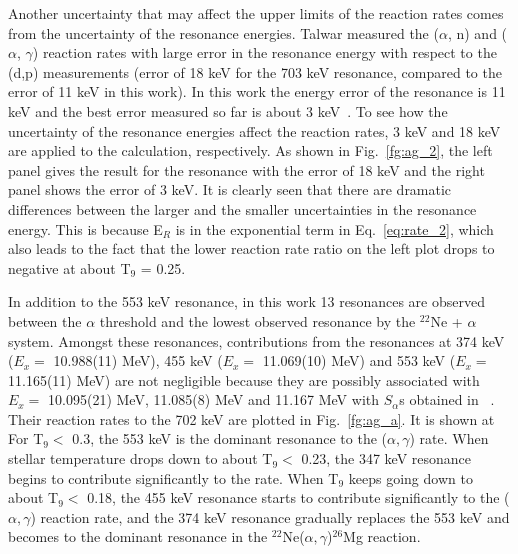 Another uncertainty that may affect the upper limits of the reaction rates comes from the uncertainty of the resonance energies. Talwar\citep{Rashi2016} measured the ($\alpha$, n) and ($\alpha$, $\gamma$) reaction rates with large error in the resonance energy with respect to the (d,p) measurements (error of 18 keV for the 703 keV resonance, compared to the error of 11 keV in this work). In this work the energy error of the resonance is 11 keV and the best error measured so far is about 3 keV~\citep{26mgaa2017}. To see how the uncertainty of the resonance energies affect the reaction rates, 3 keV and 18 keV are applied to the calculation, respectively.  As  shown in Fig.~\ref{fg:ag_2}, the left panel gives the result for the resonance with the error of 18 keV and the right panel shows the error of 3 keV. It is clearly seen that there are   dramatic differences between the larger  and the smaller uncertainties in the resonance energy. This is because   E$_{R}$ is in the exponential term in Eq.~\ref{eq:rate_2}, which also leads to the fact that the lower reaction rate ratio on the left plot drops to negative at about T$_9$ = 0.25.

In addition to the 553 keV resonance, in this work 13 resonances are observed between the $\alpha$ threshold and the lowest observed resonance by the $^{22}$Ne + $\alpha$ system. Amongst these resonances, contributions from the resonances at 374 keV ($E_x=$ 10.988(11) MeV), 455 keV ($E_x=$ 11.069(10) MeV) and 553  keV ($E_x=$ 11.165(11) MeV)  are not negligible because they are possibly associated with $E_x=$ 10.095(21) MeV, 11.085(8) MeV and 11.167 MeV with $S_{\alpha}$s obtained in ~\citep{Rashi}. Their reaction rates to the 702 keV are plotted in Fig.~\ref{fg:ag_a}. It is shown at For T$_9 <$ 0.3, the 553 keV is the dominant resonance to the ($\alpha, \gamma$) rate. When stellar temperature  drops down to about T$_9 <$ 0.23, the 347 keV resonance begins to contribute significantly  to the rate. When T$_9$ keeps going down to about T$_9 <$ 0.18, the 455 keV resonance starts to contribute significantly to the ($\alpha, \gamma$) reaction rate, and  the 374 keV resonance gradually replaces the 553 keV and becomes to the dominant resonance in the $^{22}$Ne($\alpha, \gamma$)$^{26}$Mg reaction.













